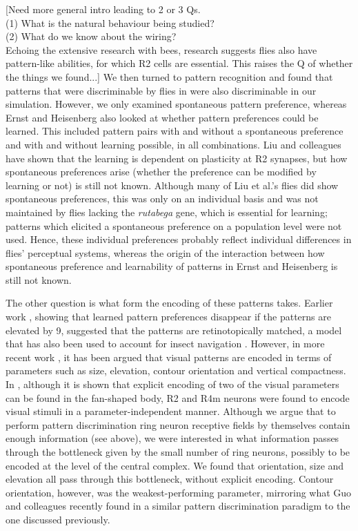 [Need more general intro leading to 2 or 3 Qs. \\
(1) What is the natural behaviour being studied? \\
(2) What do we know about the wiring? \\
Echoing the extensive research with bees, research suggests flies also have pattern-like abilities, for which R2 cells are essential.
This raises the Q of whether the things we found...]
We then turned to pattern recognition and found that patterns that were discriminable by flies in \cite{Ernst1999} were also discriminable in our simulation.
However, we only examined spontaneous pattern preference, whereas Ernst and Heisenberg \cite{Ernst1999} also looked at whether pattern preferences could be learned.
This included pattern pairs with and without a spontaneous preference and with and without learning possible, in all combinations.
Liu and colleagues \cite{Liu2006} have shown that the learning is dependent on plasticity at R2 synapses, but how spontaneous preferences arise (whether the preference can be modified by learning or not) is still not known.
Although many of Liu et al.'s \cite{Liu2006} flies did show spontaneous preferences, this was only on an individual basis and was not maintained by flies lacking the \emph{rutabega} gene, which is essential for learning; patterns which elicited a spontaneous preference on a population level were not used.
Hence, these individual preferences probably reflect individual differences in flies' perceptual systems, whereas the origin of the interaction between how spontaneous preference and learnability of patterns in Ernst and Heisenberg \cite{Ernst1999} is still not known.

The other question is what form the encoding of these patterns takes.
Earlier work \cite{Dill1993}, showing that learned pattern preferences disappear if the patterns are elevated by 9\degree, suggested that the patterns are retinotopically matched, a model that has also been used to account for insect navigation \cite{Zeil2003,Cartwright1983}.
However, in more recent work \cite{Pan2009,Liu2006,Ernst1999}, it has been argued that visual patterns are encoded in terms of parameters such as size, elevation, contour orientation and vertical compactness.
In \cite{Pan2009}, although it is shown that explicit encoding of two of the visual parameters can be found in the fan-shaped body, R2 and R4m neurons were found to encode visual stimuli in a parameter-independent manner.
Although we argue that to perform pattern discrimination ring neuron receptive fields by themselves contain enough information (see above), we were interested in what information passes through the bottleneck given by the small number of ring neurons, possibly to be encoded at the level of the central complex.
We found that orientation, size and elevation all pass through this bottleneck, without explicit encoding.
Contour orientation, however, was the weakest-performing parameter, mirroring what Guo and colleagues \cite{Guo2015} recently found in a similar pattern discrimination paradigm to the one discussed previously.

